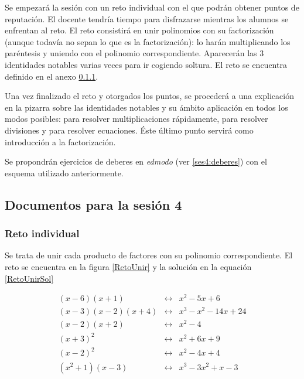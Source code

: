 Se empezará la sesión con un reto individual con el que podrán obtener puntos de reputación.
%
El docente tendría tiempo para disfrazarse mientras los alumnos se enfrentan al reto.
%
El reto consistirá en unir polinomios con su factorización (aunque todavía no sepan lo que es la factorización): lo harán multiplicando los paréntesis y uniendo con el polinomio correspondiente.
%
Aparecerán las 3 identidades notables varias veces para ir cogiendo soltura.
%
El reto se encuentra definido en el anexo \ref{app:ses4:indiv}.

Una vez finalizado el reto y otorgados los puntos, se procederá a una explicación en la pizarra sobre las identidades notables y su ámbito aplicación en todos los modos posibles:
%
para resolver multiplicaciones rápidamente, para resolver divisiones y para resolver ecuaciones.
%
Éste último punto servirá como introducción a la factorización.


Se propondrán ejercicios de deberes en \textit{edmodo} (ver \ref{ses4:deberes}) con el esquema utilizado anteriormente.


\subsection{Documentos para la sesión 4}

\subsubsection{Reto individual}
\label{app:ses4:indiv}

Se trata de unir cada producto de factores con su polinomio correspondiente. 
El reto se encuentra en la figura \ref{RetoUnir} y la solución en la equación \ref{RetoUnirSol}

\begin{equation}
\label{RetoUnirSol}
	\begin{array}{lcr}
		(x-6)(x+1) & \longleftrightarrow &  x^2-5x+6\\
		(x-3)(x-2)(x+4) & \longleftrightarrow & x^3-x^2-14x+24\\
		(x-2)(x+2) & \longleftrightarrow & x^2-4\\
		(x+3)^2 & \longleftrightarrow & x^2+6x+9\\
		(x-2)^2 & \longleftrightarrow & x^2-4x+4\\
		(x^2+1)(x-3) & \longleftrightarrow & x^3-3x^2+x-3\\
	\end{array}
\end{equation}



